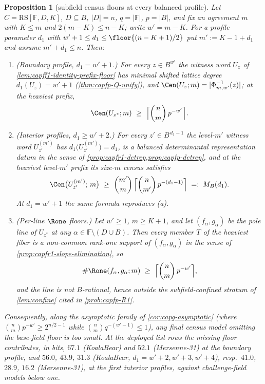 \documentclass[11pt]{article}
\newtheorem{proposition}[proposition]{Proposition}
\theoremstyle{definition}
\theoremstyle{remark}
\newcommand{\F}{\mathbb{F}}
\newcommand{\B}{B}
\newcommand{\RS}{\mathrm{RS}}
\begin{document}
\begin{proposition}[subfield census floors at every balanced profile]
\label{prop:capg-census-floor}
Let $C=\RS[\F,D,K]$, $D\subseteq\B$, $|D|=n$, $q=|\F|$, $p=|\B|$, and
fix an agreement $m$ with $K\le m$ and $2(m-K)\le n-K$; write $w'=m-K$.
For a profile parameter $d_1$ with $w'+1\le d_1\le\floor{(n-K+1)/2}$ put
$m':=K-1+d_1$ and assume $m'+d_1\le n$.  Then:
\begin{enumerate}[label=\textup{(\alph*)}]
\item \textup{(Boundary profile, $d_1=w'+1$.)}  For every $z\in\B^{w'}$
the witness word $U_z$ of \cref{lem:capff1-identity-prefix-floor} has
minimal shifted lattice degree $d_1(U_z)=w'+1$
(\cref{thm:capfp-Q-unify}), and
$\Cen(U_z;m)=|\Phi_{m,w'}^{-1}(z)|$; at the heaviest prefix,
\[
        \Cen(U_{z^{*}};m)\ \ge\
        \Bigl\lceil\binom nm\,p^{-w'}\Bigr\rceil .
\]
\item \textup{(Interior profiles, $d_1\ge w'+2$.)}  For every
$z'\in\B^{\,d_1-1}$ the level-$m'$ witness word $U^{(m')}_{z'}$ has
$d_1\bigl(U^{(m')}_{z'}\bigr)=d_1$, is a balanced determinantal
representation datum in the sense of
\cref{prop:capfr1-detrep,prop:capfp-detrep}, and at the heaviest level-$m'$
prefix its size-$m$ census satisfies
\[
        \Cen\bigl(U^{(m')}_{z'};\,m\bigr)\ \ge\
        \binom{m'}{m}\,
        \Bigl\lceil\binom n{m'}\,p^{-(d_1-1)}\Bigr\rceil
        \;=:\;M_{\B}(d_1).
\]
At $d_1=w'+1$ the same formula reproduces \textup{(a)}.
\item \textup{(Per-line $\Rone$ floors.)}  Let $w'\ge1$, $m\ge K+1$, and
let $(f_\alpha,g_\alpha)$ be the pole line of $U_{z^{*}}$ at any
$\alpha\in\F\setminus(D\cup\B)$.  Then every member $T$ of the heaviest
fiber is a non-common rank-one support of $(f_\alpha,g_\alpha)$ in the
sense of \cref{prop:capfr1-slope-elimination}, so
\[
        \#\Rone(f_\alpha,g_\alpha;m)\ \ge\
        \Bigl\lceil\binom nm\,p^{-w'}\Bigr\rceil ,
\]
and the line is not $\B$-rational, hence outside the subfield-confined
stratum of \cref{lem:confine} cited in \cref{prob:capfp-R1}.
\end{enumerate}
Consequently, along the asymptotic family of \cref{cor:capg-asymptotic}
(where $\binom nm p^{-w'}\ge2^{n/2-1}$ while
$\binom nm q^{-(w'-1)}\le1$), any final census model omitting the base-field
floor is too small.  At the deployed list rows the missing floor contributes,
in bits, $67.1$ (KoalaBear) and $52.1$ (Mersenne-31) at the boundary profile,
and $56.0$, $43.9$, $31.3$ (KoalaBear, $d_1=w'+2,w'+3,w'+4$), resp.\
$41.0$, $28.9$, $16.2$ (Mersenne-31), at the first interior profiles, against
challenge-field models below one.
\end{proposition}
\end{document}
